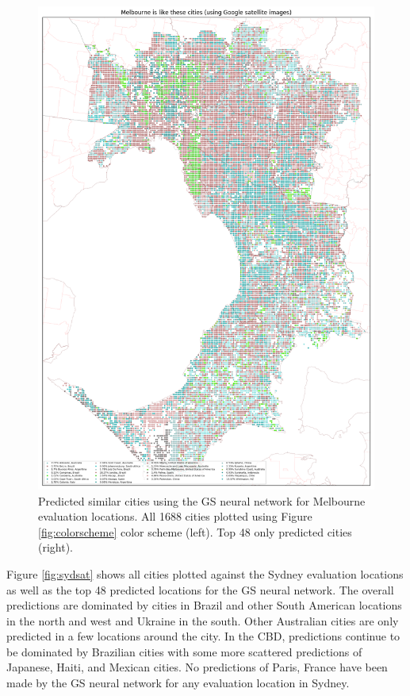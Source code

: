 \documentclass[sageh,times]{sagej}
\begin{document}
\begin{figure}[!htbp]
\includegraphics[scale=0.20]{Images/MelbourneOverallAbrev_sat.png} 
\caption{Predicted similar cities using the GS neural network for Melbourne evaluation locations. All 1688 cities plotted using Figure \ref{fig:colorscheme} color scheme (left). Top 48 only predicted cities (right).}    
 \label{fig:melsat}  
\end{figure} 



Figure \ref{fig:sydsat} shows all cities plotted against the Sydney evaluation locations as well as the top 48 predicted locations for the GS neural network. The overall predictions are dominated by cities in Brazil and other South American locations in the north and west and Ukraine in the south. Other Australian cities are only predicted in a few locations around the city. In the CBD, predictions continue to be dominated by Brazilian cities with some more scattered predictions of Japanese, Haiti, and Mexican cities. No predictions of Paris, France have been made by the GS neural network for any evaluation location in Sydney.
\end{document}
